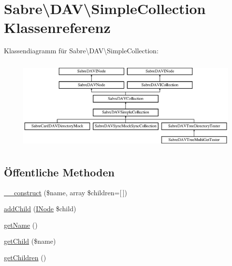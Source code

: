 \hypertarget{class_sabre_1_1_d_a_v_1_1_simple_collection}{}\section{Sabre\textbackslash{}D\+AV\textbackslash{}Simple\+Collection Klassenreferenz}
\label{class_sabre_1_1_d_a_v_1_1_simple_collection}
Klassendiagramm für Sabre\textbackslash{}D\+AV\textbackslash{}Simple\+Collection\+:\begin{figure}[H]
\begin{center}
\leavevmode
\includegraphics[height=4.705883cm]{class_sabre_1_1_d_a_v_1_1_simple_collection}
\end{center}
\end{figure}
\subsection*{Öffentliche Methoden}
\begin{DoxyCompactItemize}
\item 
\mbox{\hyperlink{class_sabre_1_1_d_a_v_1_1_simple_collection_af8dad0f593426dad74a32ca9a339e7b2}{\+\_\+\+\_\+construct}} (\$name, array \$children=\mbox{[}$\,$\mbox{]})
\item 
\mbox{\hyperlink{class_sabre_1_1_d_a_v_1_1_simple_collection_a4a404201cf57a15cb17bf26535a0ed03}{add\+Child}} (\mbox{\hyperlink{interface_sabre_1_1_d_a_v_1_1_i_node}{I\+Node}} \$child)
\item 
\mbox{\hyperlink{class_sabre_1_1_d_a_v_1_1_simple_collection_ae558cd8d61b0c9d927e7fe7b77c761d7}{get\+Name}} ()
\item 
\mbox{\hyperlink{class_sabre_1_1_d_a_v_1_1_simple_collection_af59d485179f257e2aea9bb2985ade514}{get\+Child}} (\$name)
\item 
\mbox{\hyperlink{class_sabre_1_1_d_a_v_1_1_simple_collection_abd14f5c14daf0ab6cb480c9894b25f16}{get\+Children}} ()
\end{DoxyCompactItemize}
